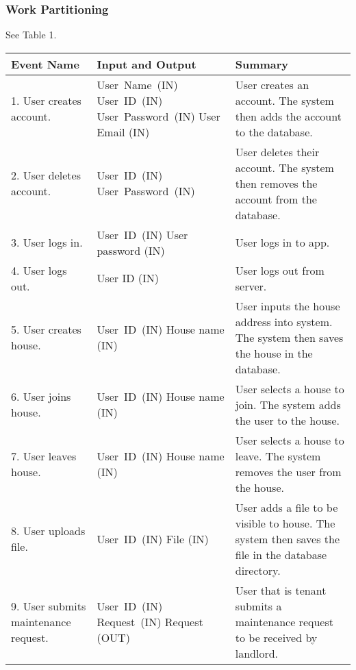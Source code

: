 \documentclass[12pt, titlepage]{article}
\begin{document}
\subsubsection{Work Partitioning} 
See Table 1.
\begin{longtable}{|p{5cm}|p{5cm}|p{5cm}|}
\hline
\textbf{Event Name}  & \textbf{Input and Output} & \textbf{Summary} \\ 
\hline
1. User creates account. & \mbox{User Name (IN)} \linebreak \mbox{User ID (IN)} 
\linebreak \mbox{User Password (IN)} \linebreak User Email (IN) & User creates 
an account. The system then adds the account to the database. \\ 
\hline
2. User deletes account. & \mbox{User ID (IN)} \linebreak \mbox{User Password 
(IN)} & User deletes their account. The system then removes the account from the 
database. \\ 
\hline
3. User logs in. & \mbox{User ID (IN)} \linebreak User password (IN) & User logs 
in to app. \\ 
\hline
4. User logs out. & User ID (IN) & User logs out from server. \\
\hline
5. User creates house. & \mbox{User ID (IN)} \linebreak House name (IN) & User 
inputs the house address into system. The system then saves the house in the 
database. \\
\hline
6. User joins house. & \mbox{User ID (IN)} \linebreak House name (IN) & User 
selects a house to join. The system adds the user to the house. \\
\hline
7. User leaves house. & \mbox{User ID (IN)} \linebreak House name (IN) & User 
selects a house to leave. The system removes the user from the house. \\
\hline
8. User uploads file. & \mbox{User ID (IN)} \linebreak File (IN) & User adds a 
file to be visible to house. The system then saves the file in the database 
directory. \\
\hline
9. User submits maintenance request. & \mbox{User ID (IN)} \linebreak 
\mbox{Request (IN)} \linebreak Request (OUT) & User that is tenant submits a 
maintenance request to be received by landlord. \\

\end{longtable}
\end{document}
